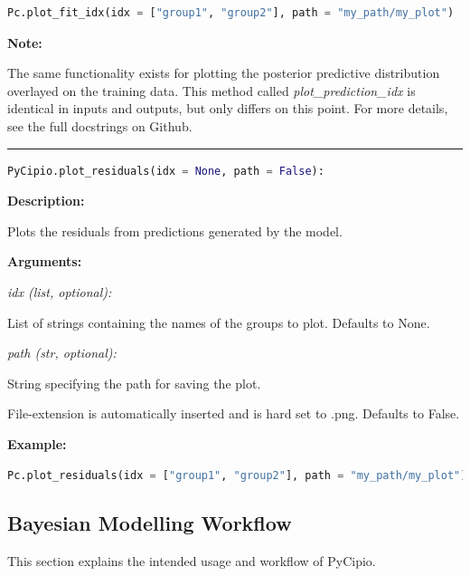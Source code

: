 \documentclass{article}
\begin{document}
\begin{lstlisting}[language=Python]
        Pc.plot_fit_idx(idx = ["group1", "group2"], path = "my_path/my_plot")
\end{lstlisting}

\noindent \textbf{Note:}

\noindent The same functionality exists for plotting the posterior predictive distribution overlayed on the training data. This method called \textit{plot\_prediction\_idx} is identical in inputs and outputs, but only differs on this point. For more details, see the full docstrings on Github. 


\hrule

\begin{lstlisting}[language=Python]
    PyCipio.plot_residuals(idx = None, path = False):
\end{lstlisting}

\indent \textbf{Description:} 

\indent \indent Plots the residuals from predictions generated by the model.

\indent \textbf{Arguments:}

\indent \indent \textit{idx (list, optional):}

\indent \indent \indent List of strings containing the names of the groups to plot. Defaults to None.

\indent \indent \textit{path (str, optional):}

\indent \indent \indent String specifying the path for saving the plot. 

\indent \indent \indent File-extension is automatically inserted and is hard set to .png. Defaults to False.

\indent \textbf{Example:}

\begin{lstlisting}[language=Python]
        Pc.plot_residuals(idx = ["group1", "group2"], path = "my_path/my_plot")
\end{lstlisting}

\subsection{Bayesian Modelling Workflow}

This section explains the intended usage and workflow of PyCipio. 
\end{document}
